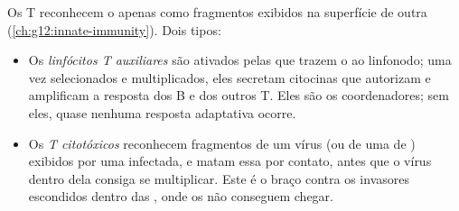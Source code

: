 \begin{proposition}[Os linfócitos T]\label{prop:g12:adaptive-immunity:tcells}
Os  T reconhecem o  apenas como fragmentos exibidos
na superfície de outra  (\cref{ch:g12:innate-immunity}). Dois
tipos:
\begin{itemize}
  \item Os \emph{linfócitos T auxiliares}
        são ativados pelas  que trazem o  ao
        linfonodo; uma vez selecionados e multiplicados, eles secretam
        citocinas que autorizam e amplificam a resposta dos 
        B e dos outros  T. Eles são os coordenadores; sem
        eles, quase nenhuma resposta adaptativa ocorre.
  \item Os \emph{ T citotóxicos} reconhecem fragmentos de um
        vírus (ou de uma  de ) exibidos por uma 
        infectada, e matam essa  por contato, antes que o vírus
        dentro dela consiga se multiplicar. Este é o braço contra os
        invasores escondidos dentro das , onde os  não
        conseguem chegar.
\end{itemize}
\end{proposition}
\admitted

